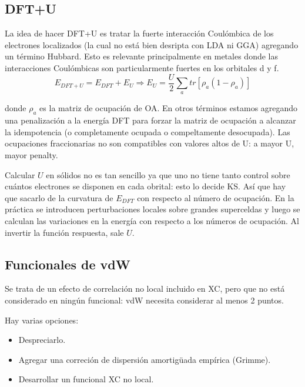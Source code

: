 \subsection{DFT+U}

  La idea de hacer DFT+U es tratar la fuerte interacción Coulómbica de los electrones localizados (la cual no está bien desripta con LDA ni GGA) agregando un término Hubbard. Esto es relevante principalmente en metales donde las interacciones Coulómbicas son particularmente fuertes en los orbitales d y f.
   $$E_{DFT+U} = E_{DFT} + E_{U} \Rightarrow E_{U} = \frac{U}{2} \sum_a tr\left[ \rho_a (1 - \rho_a)  \right]$$

  donde $\rho_a$ es la matriz de ocupación de OA. En otros términos estamos agregando una penalización a la energía DFT para forzar la matriz de ocupación a alcanzar la idempotencia (o completamente ocupada o compeltamente desocupada). Las ocupaciones fraccionarias no son compatibles con valores altos de U: a mayor U, mayor penalty.


  Calcular $U$ en sólidos no es tan sencillo ya que uno no tiene tanto control sobre cuántos electrones se disponen en cada obrital: esto lo decide KS. Así que hay que sacarlo de la curvatura de $E_{DFT}$ con respecto al número de ocupación. En la práctica se introducen perturbaciones locales sobre grandes superceldas y luego se calculan las variaciones en la energía con respecto a los números de ocupación. Al invertir la función respuesta, sale $U$.



\subsection{Funcionales de vdW}

  Se trata de un efecto de correlación no local incluido en XC, pero que no está considerado en ningún funcional: vdW necesita considerar al menos 2 puntos.

  Hay varias opciones:
    \begin{itemize}
      \item Despreciarlo.
      \item Agregar una correción de dispersión amortigüada empírica (Grimme).
      \item Desarrollar un funcional XC no local.
    \end{itemize}

